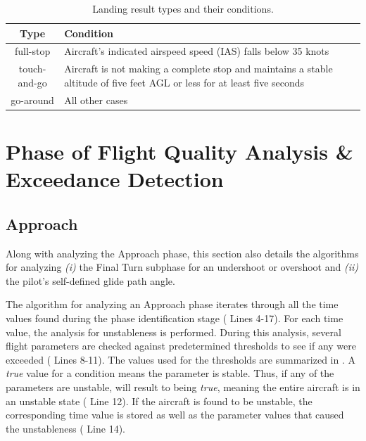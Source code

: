     \begin{table}
        \caption{\small{Landing result types and their conditions.}}
        \label{tab:landing_types}
        \vspace{3pt}
        \centering
        \begin{tabular}{@{} c m{.70\linewidth} @{}}
            \hline
            \bfseries Type & \bfseries Condition \\ \hline
            full-stop    & Aircraft's indicated airspeed speed (IAS) falls below 35 knots \\ \hline
            touch-and-go & Aircraft is not making a complete stop and maintains a stable altitude of five feet AGL or less for at least five seconds \\ \hline
            go-around    & All other cases \\ \hline
        \end{tabular}
    \end{table}
    

\section{Phase of Flight Quality Analysis \& Exceedance Detection} \label{sec:phase_quality}
    
	\subsection{Approach}
        
        Along with analyzing the Approach phase, this section also details the algorithms for analyzing \textit{(i)} the Final Turn subphase for an undershoot or overshoot and \textit{(ii)} the pilot's self-defined glide path angle.
        
        The algorithm for analyzing an Approach phase iterates through all the time values found during the phase identification stage ( Lines 4-17).  For each time value, the analysis for unstableness is performed.  During this analysis, several flight parameters are checked against predetermined thresholds to see if any were exceeded ( Lines 8-11).  The values used for the thresholds are summarized in .  A \textit{true} value for a condition means the parameter is stable.  Thus, if any of the parameters are unstable,  will result to being \textit{true}, meaning the entire aircraft is in an unstable state ( Line 12).  If the aircraft is found to be unstable, the corresponding time value is stored as well as the parameter values that caused the unstableness ( Line 14).
        
